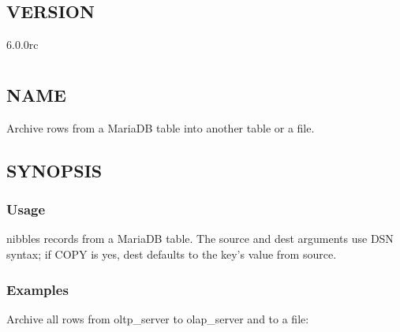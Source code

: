 \documentclass[letterpaper,10pt,english]{sphinxmanual}
\begin{document}
\section{VERSION}
\label{\detokenize{mariadb-align-output:version}}
 6.0.0rc


\chapter{}
\label{\detokenize{mariadb-archiver:mariadb-archiver}}\label{\detokenize{mariadb-archiver::doc}}

\section{NAME}
\label{\detokenize{mariadb-archiver:name}}
 \sphinxhyphen{} Archive rows from a MariaDB table into another table or a file.


\section{SYNOPSIS}
\label{\detokenize{mariadb-archiver:synopsis}}

\subsection{Usage}
\label{\detokenize{mariadb-archiver:usage}}
\begin{sphinxVerbatim}[commandchars=\\\{\}]
 \PYG{p}{[}\PYG{p}{]}    
\end{sphinxVerbatim}

 nibbles records from a MariaDB table.  The \textendash{}source and \textendash{}dest
arguments use DSN syntax; if COPY is yes, \textendash{}dest defaults to the key’s value
from \textendash{}source.


\subsection{Examples}
\label{\detokenize{mariadb-archiver:examples}}
Archive all rows from oltp\_server to olap\_server and to a file:
\end{document}
